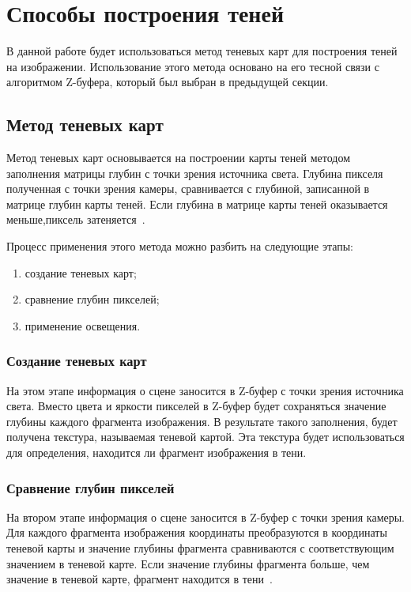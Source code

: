 \section{Способы построения теней}

В данной работе будет использоваться метод теневых карт для построения теней на изображении. Использование этого метода основано на его тесной связи с алгоритмом Z-буфера, который был выбран в предыдущей секции.

\subsection*{Метод теневых карт}

Метод теневых карт основывается на построении карты теней методом заполнения матрицы глубин с точки зрения источника света. Глубина пикселя полученная с точки зрения камеры, сравнивается с глубиной, записанной в матрице глубин карты теней. Если глубина в матрице карты теней оказывается меньше,пиксель затеняется~\cite{Shadows}.

Процесс применения этого метода можно разбить на следующие этапы:

\begin{enumerate}
    \item создание теневых карт;
    \item сравнение глубин пикселей;    
    \item применение освещения.
\end{enumerate}

\subsubsection*{Создание теневых карт}

На этом этапе информация о сцене заносится в Z-буфер с точки зрения источника света. Вместо цвета и яркости пикселей в Z-буфер будет сохраняться значение глубины каждого фрагмента изображения. В результате такого заполнения, будет получена текстура, называемая теневой картой. Эта текстура будет использоваться для определения, находится ли фрагмент изображения в тени.

\subsubsection*{Сравнение глубин пикселей} 

На втором этапе информация о сцене заносится в Z-буфер с точки зрения камеры. Для каждого фрагмента изображения координаты преобразуются в координаты теневой карты и значение глубины фрагмента сравниваются  с соответствующим значением в теневой карте. 
Если значение глубины фрагмента больше, чем значение в теневой карте, фрагмент находится в тени~\cite{LightMaps}.

